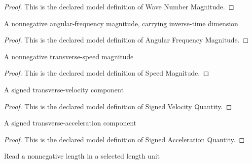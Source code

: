 \begin{proof}
  This is the declared model definition of Wave Number Magnitude.
\end{proof}
\begin{definition}
  \label{def:physics:phyx-mini-0288:phyxminiproblems-problemphyxmini0288-angularfrequencymagnitude}
  A nonnegative angular-frequency magnitude, carrying inverse-time dimension
\end{definition}
\begin{proof}
  This is the declared model definition of Angular Frequency Magnitude.
\end{proof}
\begin{definition}
  \label{def:physics:phyx-mini-0288:phyxminiproblems-problemphyxmini0288-speedmagnitude}
  A nonnegative transverse-speed magnitude
\end{definition}
\begin{proof}
  This is the declared model definition of Speed Magnitude.
\end{proof}
\begin{definition}
  \label{def:physics:phyx-mini-0288:phyxminiproblems-problemphyxmini0288-signedvelocityquantity}
  A signed transverse-velocity component
\end{definition}
\begin{proof}
  This is the declared model definition of Signed Velocity Quantity.
\end{proof}
\begin{definition}
  \label{def:physics:phyx-mini-0288:phyxminiproblems-problemphyxmini0288-signedaccelerationquantity}
  A signed transverse-acceleration component
\end{definition}
\begin{proof}
  This is the declared model definition of Signed Acceleration Quantity.
\end{proof}
\begin{definition}
  \label{def:physics:phyx-mini-0288:phyxminiproblems-problemphyxmini0288-lengthmagnitudereadout}
  Read a nonnegative length in a selected length unit
\end{definition}
